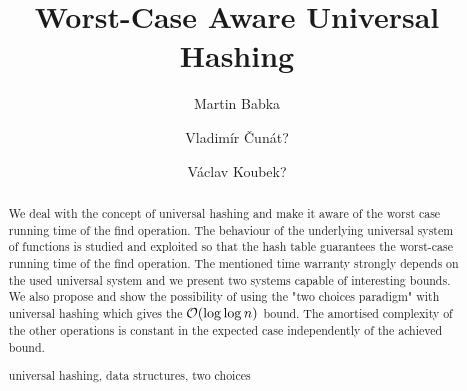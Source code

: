 \documentclass[runningheads,a4paper]{llncs}
\newcommand{\keywords}[1]{\par\addvspace\baselineskip
\noindent\keywordname\enspace\ignorespaces#1}
\begin{document}
\mainmatter

\author{Martin Babka
\and Vladimír Čunát? \and Václav Koubek?}

\title{Worst-Case Aware Universal Hashing}



\maketitle

\begin{abstract}
We deal with the concept of universal hashing and make it aware of the worst case running time of the find operation. 
The behaviour of the underlying universal system of functions is studied and exploited so that the hash table guarantees the worst-case running time of the find operation.
The mentioned time warranty strongly depends on the used universal system and we present two systems capable of interesting bounds. 
We also propose and show the possibility of using the "two choices paradigm" with universal hashing which gives the $\mathcal{O}(\log \log n)$ bound.
The amortised complexity of the other operations is constant in the expected case independently of the achieved bound.

\keywords{universal hashing, data structures, two choices}
\end{abstract}








\end{document}
